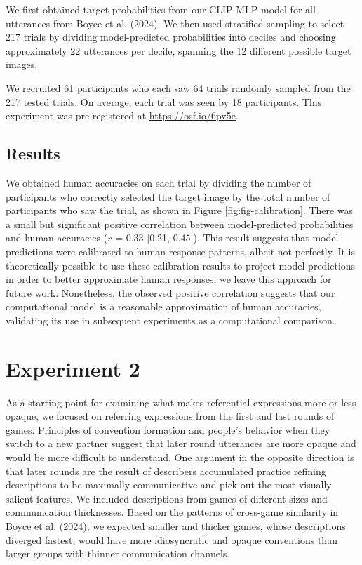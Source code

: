 \documentclass[10pt, letterpaper]{article}
\begin{document}
We first obtained target probabilities from our CLIP-MLP model for all
utterances from Boyce et al. (2024). We then used stratified sampling to
select 217 trials by dividing model-predicted probabilities into deciles
and choosing approximately 22 utterances per decile, spanning the 12
different possible target images.

We recruited 61 participants who each saw 64 trials randomly sampled
from the 217 tested trials. On average, each trial was seen by 18
participants. This experiment was pre-registered at
\url{https://osf.io/6pv5e}.

\subsection{Results}\label{results}

We obtained human accuracies on each trial by dividing the number of
participants who correctly selected the target image by the total number
of participants who saw the trial, as shown in Figure
\ref{fig:fig-calibration}. There was a small but significant positive
correlation between model-predicted probabilities and human accuracies
(\(r\) = 0.33 {[}0.21, 0.45{]}). This result suggests that model
predictions were calibrated to human response patterns, albeit not
perfectly. It is theoretically possible to use these calibration results
to project model predictions in order to better approximate human
responses; we leave this approach for future work. Nonetheless, the
observed positive correlation suggests that our computational model is a
reasonable approximation of human accuracies, validating its use in
subsequent experiments as a computational comparison.

\section{Experiment 2}\label{experiment-2}

As a starting point for examining what makes referential expressions
more or less opaque, we focused on referring expressions from the first
and last rounds of games. Principles of convention formation and
people's behavior when they switch to a new partner suggest that later
round utterances are more opaque and would be more difficult to
understand. One argument in the opposite direction is that later rounds
are the result of describers accumulated practice refining descriptions
to be maximally communicative and pick out the most visually salient
features. We included descriptions from games of different sizes and
communication thicknesses. Based on the patterns of cross-game
similarity in Boyce et al. (2024), we expected smaller and thicker
games, whose descriptions diverged fastest, would have more
idiosyncratic and opaque conventions than larger groups with thinner
communication channels.
\end{document}
